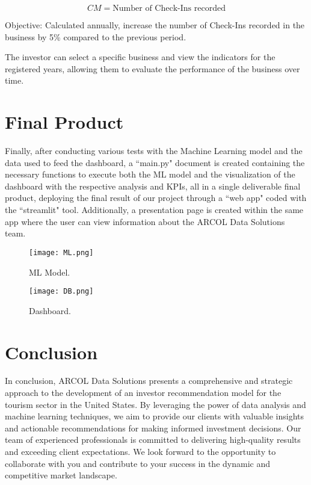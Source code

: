 \documentclass[12pt]{article}
\begin{document}
\[ CM = \text{Number of Check-Ins recorded} \]

Objective: Calculated annually, increase the number of Check-Ins recorded in the business by 5\% compared to the previous period.

The investor can select a specific business and view the indicators for the registered years, allowing them to evaluate the performance of the business over time.

\section{Final Product}

Finally, after conducting various tests with the Machine Learning model and the data used to feed the dashboard, a ``main.py" document is created containing the necessary functions to execute both the ML model and the visualization of the dashboard with the respective analysis and KPIs, all in a single deliverable final product, deploying the final result of our project through a ``web app" coded with the ``streamlit" tool. Additionally, a presentation page is created within the same app where the user can view information about the ARCOL Data Solutions team.

\begin{figure}[H]
  \centering
  \texttt{[image: ML.png]}
  \caption{ML Model.}
  \label{fig: ML Model}
\end{figure}

\begin{figure}[H]
  \centering
  \texttt{[image: DB.png]}
  \caption{Dashboard.}
  \label{fig: Dashboard}
\end{figure}

\section{Conclusion}
In conclusion, ARCOL Data Solutions presents a comprehensive and strategic approach to the development of an investor recommendation model for the tourism sector in the United States. By leveraging the power of data analysis and machine learning techniques, we aim to provide our clients with valuable insights and actionable recommendations for making informed investment decisions. Our team of experienced professionals is committed to delivering high-quality results and exceeding client expectations. We look forward to the opportunity to collaborate with you and contribute to your success in the dynamic and competitive market landscape.
\end{document}
